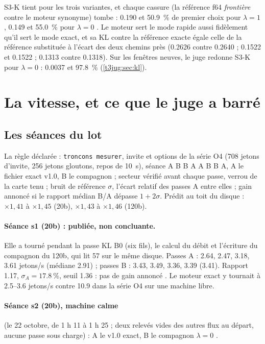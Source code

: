S3-K tient pour les trois variantes, et chaque cassure (la référence f64 \emph{frontière} contre le moteur synonyme) tombe : \num{0.190} et \SI{50.9}{\percent} de premier choix pour $\lambda = 1$, \num{0.149} et \SI{55.0}{\percent} pour $\lambda = 0$ \mes. Le moteur sert le mode rapide aussi fidèlement qu'il sert le mode exact, et sa KL contre la référence exacte égale celle de la référence substituée à l'écart des deux chemins près (\num{0.2626} contre \num{0.2640} ; \num{0.1522} et \num{0.1522} ; \num{0.1313} contre \num{0.1318}). Sur les fenêtres neuves, le juge redonne S3-K pour $\lambda = 0$ : \num{0.0037} et \SI{97.8}{\percent} (\cref{t3jug:sec:kl}).

\section{La vitesse, et ce que le juge a barré}\label{t3sno:sec:vitesse}

\subsection{Les séances du lot}\label{t3sno:sec:seances}

La règle déclarée : \texttt{troncons mesurer}, invite et options de la série O4 (708 jetons d'invite, 256 jetons gloutons, repos de \SI{10}{\second}), séance A B B A A B B A, A le fichier exact v1.0, B le compagnon ; secteur vérifié avant chaque passe, verrou de la carte tenu ; bruit de référence $\sigma$, l'écart relatif des passes A entre elles ; gain annoncé si le rapport médian B/A dépasse $1 + 2\sigma$. Prédit au toit du disque : $\times 1{,}41$ à $\times 1{,}45$ (20b), $\times 1{,}43$ à $\times 1{,}46$ (120b).

\paragraph{Séance s1 (20b) : publiée, non concluante.} Elle a tourné pendant la passe KL B0 (six fils), le calcul du débit et l'écriture du compagnon du 120b, qui lit \SI{57}{\Go} sur le même disque. Passes A : \num{2.64}, \num{2.47}, \num{3.18}, \num{3.61} jetons/s (médiane \num{2.91}) ; passes B : \num{3.43}, \num{3.49}, \num{3.36}, \num{3.39} (\num{3.41}). Rapport \num{1.17}, $\sigma_A = \SI{17.8}{\percent}$, seuil \num{1.36} : pas de gain annoncé \mes. Le moteur exact y tournait à \numrange{2.5}{3.6} jetons/s contre \num{10.9} dans la série O4 sur une machine libre.

\paragraph{Séance s2 (20b), machine calme} (le 22 octobre, de 1 h 11 à 1 h 25 ; deux relevés vides des autres flux au départ, aucune passe sous charge) : A le v1.0 exact, B le compagnon $\lambda = 0$ \mes.

